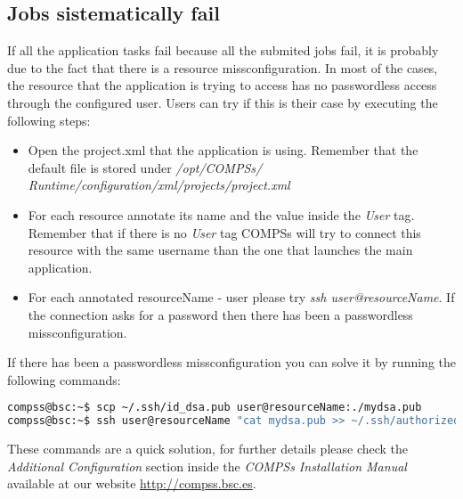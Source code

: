 \subsection{Jobs sistematically fail}
If all the application tasks fail because all the submited jobs fail, it is probably due to the fact that there is a resource 
missconfiguration. In most of the cases, the resource that the application is trying to access has no passwordless access through
the configured user. Users can try if this is their case by executing the following steps:
\begin{itemize}
 \item Open the project.xml that the application is using. Remember that the default file is stored under \textit{/opt/COMPSs/
 Runtime/configuration/xml/projects/project.xml}
 \item For each resource annotate its name and the value inside the \textit{User} tag. Remember that if there is no \textit{User}
 tag COMPSs will try to connect this resource with the same username than the one that launches the main application.
 \item For each annotated resourceName - user please try \textit{ssh user@resourceName}. If the connection asks for a password then
 there has been a passwordless missconfiguration.
\end{itemize}

If there has been a passwordless missconfiguration you can solve it by running the following commands:
\begin{lstlisting}[language=bash]
compss@bsc:~$ scp ~/.ssh/id_dsa.pub user@resourceName:./mydsa.pub
compss@bsc:~$ ssh user@resourceName "cat mydsa.pub >> ~/.ssh/authorized_keys; rm ./mydsa.pub"
\end{lstlisting}

These commands are a quick solution, for further details please check the \textit{Additional Configuration} section 
inside the \textit{COMPSs Installation Manual} available at our website \url{http://compss.bsc.es}.
